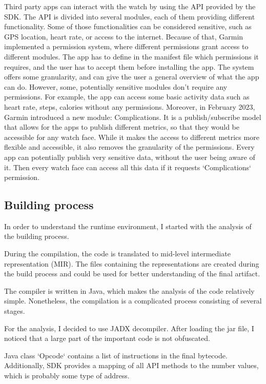 Third party apps can interact with the watch by using the API provided by the SDK.
The API is divided into several modules, each of them providing different functionality.
Some of those functionalities can be considered sensitive, such as GPS location, heart rate, or access to the internet.
Because of that, Garmin implemented a permission system, where different permissions grant access to different modules.
The app has to define in the manifest file which permissions it requires, and the user has to accept them before installing the app.
The system offers some granularity, and can give the user a general overview of what the app can do.
However, some, potentially sensitive modules don't require any permissions.
For example, the app can access some basic activity data such as heart rate, steps, calories without any permissions.
Moreover, in February 2023, Garmin introduced a new module: Complications.
It is a publish/subscribe model that allows for the apps to publish different metrics, so that they would be accessible for any watch face.
While it makes the access to different metrics more flexible and accessible, it also removes the granularity of the permissions.
Every app can potentially publish very sensitive data, without the user being aware of it.
Then every watch face can access all this data if it requests `Complications` permission.

\subsection{Building process}
In order to understand the runtime environment, I started with the analysis of the building process.

During the compilation, the code is translated to mid-level intermediate representation (MIR).
The files containing the representations are created during the build process and could be used for better understanding of the final artifact.

The compiler is written in Java, which makes the analysis of the code relatively simple.
Nonetheless, the compilation is a complicated process consisting of several stages.

For the analysis, I decided to use JADX decompiler\cite{jadx}.
After loading the jar file, I noticed that a large part of the important code is not obfuscated.


Java class `Opcode` contains a list of instructions in the final bytecode.
Additionally, SDK provides a mapping of all API methods to the number values, which is probably some type of address.

